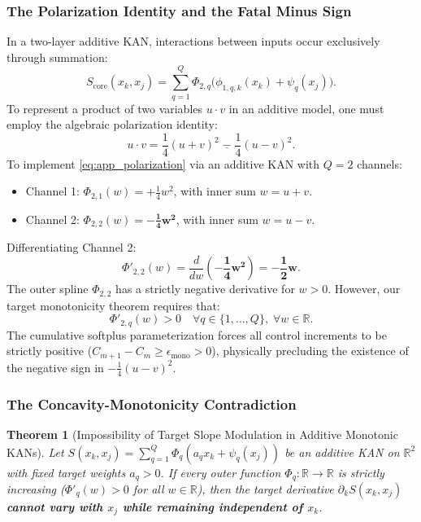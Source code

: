 \documentclass[11pt,a4paper]{article}
\theoremstyle{plain}
\newtheorem{theorem}{Theorem}[section]
\theoremstyle{definition}
\theoremstyle{remark}
\begin{document}
\subsubsection{The Polarization Identity and the Fatal Minus Sign}
In a two-layer additive KAN, interactions between inputs occur exclusively through summation:
\begin{equation}
    S_{\text{core}}(x_k, x_j) = \sum_{q=1}^Q \Phi_{2, q}\Big( \phi_{1, q, k}(x_k) + \psi_q(x_j) \Big).
\end{equation}
To represent a product of two variables $u \cdot v$ in an additive model, one must employ the algebraic polarization identity:
\begin{equation}
    u \cdot v = \frac{1}{4}(u + v)^2 \; \mathbf{\underline{-}} \; \frac{1}{4}(u - v)^2.
    \label{eq:app_polarization}
\end{equation}
To implement \eqref{eq:app_polarization} via an additive KAN with $Q = 2$ channels:
\begin{itemize}
    \item Channel 1: $\Phi_{2, 1}(w) = +\frac{1}{4} w^2$, with inner sum $w = u + v$.
    \item Channel 2: $\Phi_{2, 2}(w) = \mathbf{-\frac{1}{4} w^2}$, with inner sum $w = u - v$.
\end{itemize}
Differentiating Channel 2:
\begin{equation}
    \Phi'_{2, 2}(w) = \frac{d}{dw} \left( \mathbf{-\frac{1}{4} w^2} \right) = \mathbf{-\frac{1}{2} w}.
\end{equation}
The outer spline $\Phi_{2, 2}$ has a strictly negative derivative for $w > 0$. However, our target monotonicity theorem requires that:
\begin{equation}
    \Phi'_{2, q}(w) > 0 \quad \forall q \in \{1, \dots, Q\}, \; \forall w \in \mathbb{R}.
\end{equation}
The cumulative softplus parameterization forces all control increments to be strictly positive ($C_{m+1} - C_m \ge \epsilon_{\text{mono}} > 0$), physically precluding the existence of the negative sign in $-\frac{1}{4}(u-v)^2$.

\subsubsection{The Concavity-Monotonicity Contradiction}

\begin{theorem}[Impossibility of Target Slope Modulation in Additive Monotonic KANs]
Let $S(x_k, x_j) = \sum_{q=1}^Q \Phi_q\left( a_q x_k + \psi_q(x_j) \right)$ be an additive KAN on $\mathbb{R}^2$ with fixed target weights $a_q > 0$. If every outer function $\Phi_q: \mathbb{R} \to \mathbb{R}$ is strictly increasing ($\Phi'_q(w) > 0$ for all $w \in \mathbb{R}$), then the target derivative $\partial_k S(x_k, x_j)$ \textbf{cannot vary with $x_j$ while remaining independent of $x_k$}.
\end{theorem}
\end{document}
